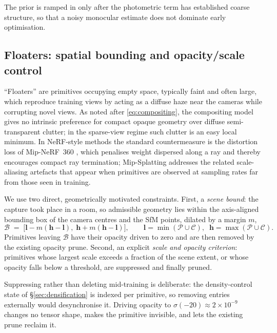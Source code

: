 The prior is ramped in only after the photometric term has established coarse
structure, so that a noisy monocular estimate does not dominate early
optimisation.

\subsection{Floaters: spatial bounding and opacity/scale control}
\label{sec:floaters}

``Floaters'' are primitives occupying empty space, typically faint and often
large, which reproduce training views by acting as a diffuse haze near the cameras
while corrupting novel views. As noted after \eqref{eq:compositing}, the
compositing model gives no intrinsic preference for compact opaque geometry over
diffuse semi-transparent clutter; in the sparse-view regime such clutter is an
easy local minimum. In NeRF-style methods the standard countermeasure is the
distortion loss of Mip-NeRF~360 \cite{barron2022mipnerf360}, which penalises
weight dispersed along a ray and thereby encourages compact ray termination;
Mip-Splatting \cite{yu2024mipsplatting} addresses the related scale-aliasing
artefacts that appear when primitives are observed at sampling rates far from
those seen in training.

We use two direct, geometrically motivated constraints. First, a \emph{scene
bound}: the capture took place in a room, so admissible geometry lies within the
axis-aligned bounding box of the camera centres and the SfM points, dilated by a
margin $m$,
\begin{equation}
  \mathcal{B} \;=\; \big[\bm{l}-m(\bm{h}-\bm{l}),\;\bm{h}+m(\bm{h}-\bm{l})\big],
  \qquad
  \bm{l}=\min(\mathcal{P}\cup\mathcal{C}),\;\;
  \bm{h}=\max(\mathcal{P}\cup\mathcal{C}).
\end{equation}
Primitives leaving $\mathcal{B}$ have their opacity driven to zero and are then
removed by the existing opacity prune. Second, an explicit \emph{scale and opacity
criterion}: primitives whose largest scale exceeds a fraction of the scene extent,
or whose opacity falls below a threshold, are suppressed and finally pruned.

Suppressing rather than deleting mid-training is deliberate: the density-control
state of \S\ref{sec:densification} is indexed per primitive, so removing entries
externally would desynchronise it. Driving opacity to $\sigma(-20)\approx 2\times10^{-9}$
changes no tensor shape, makes the primitive invisible, and lets the existing
prune reclaim it.

